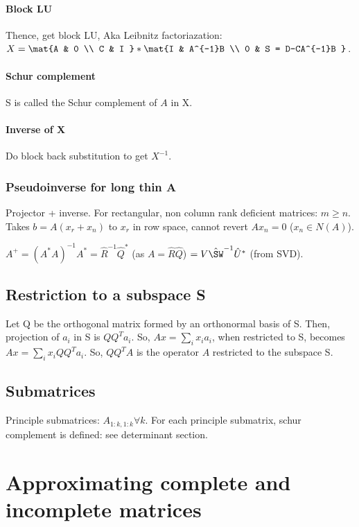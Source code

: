 \documentclass[oneside, article]{memoir}
\begin{document}
\subsubsection{Block LU}
Thence, get block LU, Aka Leibnitz factoriazation: \\
$X = \mat{A & 0 \\ C & I } * \mat{I & A^{-1}B \\ 0 & S = D-CA^{-1}B }$.

\subsubsection{Schur complement}
S is called the Schur complement of $A$ in X.

\subsubsection{Inverse of X}
Do block back substitution to get $X^{-1}$.

\subsection{Pseudoinverse for long thin A}
Projector + inverse. For rectangular, non column rank deficient matrices: $m\geq n$. Takes $b = A(x_{r}+x_{n})$ to $x_{r}$ in row space, cannot revert $Ax_{n}=0$ ($x_{n} \in N(A)$).

$A^{+} = (A^{*}A)^{-1}A^{*} = \hat{R}^{-1}\hat{Q}^{*}$ (as $A=\hat{R}\hat{Q}$) $= V\hat{\SW}^{-1}\hat{U}^{*}$ (from SVD).

\section{Restriction to a subspace S}
Let Q be the orthogonal matrix formed by an orthonormal basis of S.  Then, projection of $a_i$ in S is $QQ^{T}a_i$. So, $Ax = \sum_i x_i a_i$, when restricted to S, becomes $Ax = \sum_i x_i QQ^{T}a_i$. So, $QQ^{T}A$ is the operator $A$ restricted to the subspace S.

\section{Submatrices}
Principle submatrices: $A_{1:k, 1:k} \forall k$. For each principle submatrix, schur complement is defined: see determinant section.

\chapter{Approximating complete and incomplete matrices}
\end{document}
